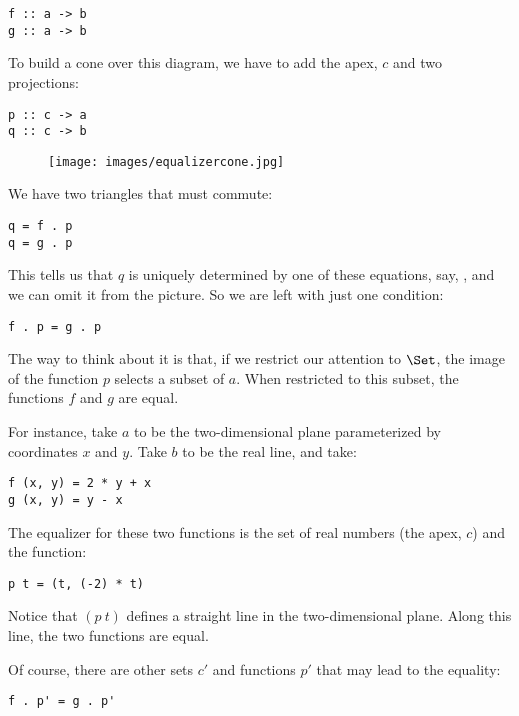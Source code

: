 \begin{Verbatim}
f :: a -> b 
g :: a -> b
\end{Verbatim}

To build a cone over this diagram, we have to add the apex, $c$
and two projections:

\begin{Verbatim}
p :: c -> a 
q :: c -> b
\end{Verbatim}

\begin{figure}[H]
\centering
\texttt{[image: images/equalizercone.jpg]}
\end{figure}

\noindent
We have two triangles that must commute:

\begin{Verbatim}
q = f . p 
q = g . p
\end{Verbatim}

This tells us that $q$ is uniquely determined by one of these
equations, say, , and we can omit it from the
picture. So we are left with just one condition:

\begin{Verbatim}
f . p = g . p
\end{Verbatim}

The way to think about it is that, if we restrict our attention to
$\Set$, the image of the function $p$ selects a subset of
$a$. When restricted to this subset, the functions $f$ and
$g$ are equal.

For instance, take $a$ to be the two-dimensional plane
parameterized by coordinates $x$ and $y$. Take $b$
to be the real line, and take:

\begin{Verbatim}
f (x, y) = 2 * y + x 
g (x, y) = y - x
\end{Verbatim}

The equalizer for these two functions is the set of real numbers (the
apex, $c$) and the function:

\begin{Verbatim}
p t = (t, (-2) * t)
\end{Verbatim}

Notice that $(p~t)$ defines a straight line in the
two-dimensional plane. Along this line, the two functions are equal.

Of course, there are other sets $c\prime$ and functions
$p\prime$ that may lead to the equality:

\begin{Verbatim}
f . p' = g . p'
\end{Verbatim}

